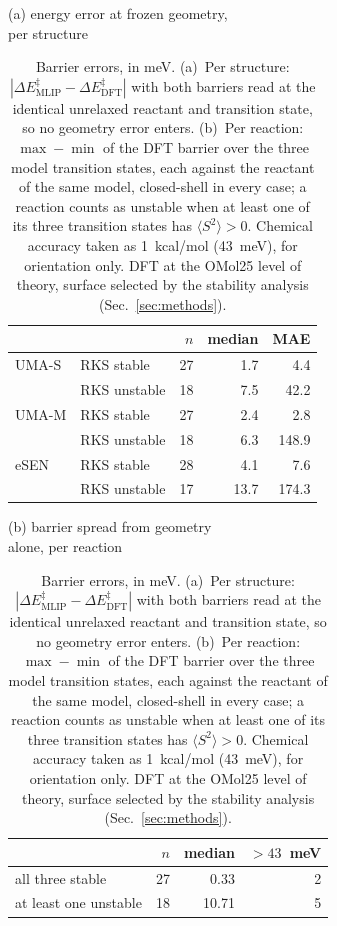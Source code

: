 \begin{table}[!t]
\caption{Barrier errors, in meV.
(a)~Per structure: $|\Delta E^\ddagger_\mathrm{MLIP} -
\Delta E^\ddagger_\mathrm{DFT}|$ with both barriers read at the identical
unrelaxed reactant and transition state, so no geometry error enters.
(b)~Per reaction: $\max-\min$ of the DFT barrier over the three model
transition states, each against the reactant of the same model, closed-shell
in every case; a reaction counts as unstable when at least one of its three
transition states has $\langle S^2 \rangle > 0$.
Chemical accuracy taken as 1~kcal/mol (43~meV), for orientation only.
DFT at the OMol25 level of theory, surface selected by the stability
analysis (Sec.~\ref{sec:methods}).}
\label{tab:barrier}
\centering
\begin{minipage}[t]{0.56\linewidth}
\centering
(a) energy error at frozen geometry,\\ per structure\\[2pt]
\begin{tabular}{llrrr}
\toprule
 & & $n$ & median & MAE \\
\midrule
UMA-S & RKS stable   & 27 & 1.7  & 4.4 \\
      & RKS unstable & 18 & 7.5  & 42.2 \\
UMA-M & RKS stable   & 27 & 2.4  & 2.8 \\
      & RKS unstable & 18 & 6.3  & 148.9 \\
eSEN  & RKS stable   & 28 & 4.1  & 7.6 \\
      & RKS unstable & 17 & 13.7 & 174.3 \\
\bottomrule
\end{tabular}
\end{minipage}\hfill
\begin{minipage}[t]{0.42\linewidth}
\centering
(b) barrier spread from geometry\\ alone, per reaction\\[2pt]
\begin{tabular}{lrrr}
\toprule
 & $n$ & median & $>43$~meV \\
\midrule
all three stable      & 27 & 0.33  & 2 \\
at least one unstable & 18 & 10.71 & 5 \\
\bottomrule
\end{tabular}
\end{minipage}
\end{table}

